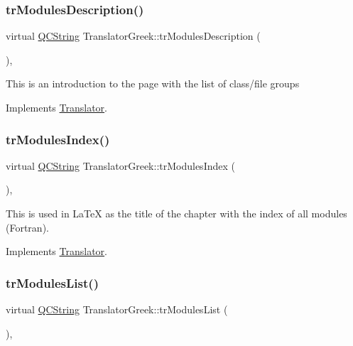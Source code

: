 \subsubsection{\texorpdfstring{trModulesDescription()}{trModulesDescription()}}
{\footnotesize\ttfamily virtual \mbox{\hyperlink{class_q_c_string}{Q\+C\+String}} Translator\+Greek\+::tr\+Modules\+Description (\begin{DoxyParamCaption}{ }\end{DoxyParamCaption})\hspace{0.3cm}{\ttfamily [inline]}, {\ttfamily [virtual]}}

This is an introduction to the page with the list of class/file groups 

Implements \mbox{\hyperlink{class_translator}{Translator}}.

\mbox{\label{class_translator_greek_a1a764773f34e724b6efe31a37a4f79de}} 
\subsubsection{\texorpdfstring{trModulesIndex()}{trModulesIndex()}}
{\footnotesize\ttfamily virtual \mbox{\hyperlink{class_q_c_string}{Q\+C\+String}} Translator\+Greek\+::tr\+Modules\+Index (\begin{DoxyParamCaption}{ }\end{DoxyParamCaption})\hspace{0.3cm}{\ttfamily [inline]}, {\ttfamily [virtual]}}

This is used in La\+TeX as the title of the chapter with the index of all modules (Fortran). 

Implements \mbox{\hyperlink{class_translator}{Translator}}.

\mbox{\label{class_translator_greek_a617664ec46372e2557437c484b0c9585}} 
\subsubsection{\texorpdfstring{trModulesList()}{trModulesList()}}
{\footnotesize\ttfamily virtual \mbox{\hyperlink{class_q_c_string}{Q\+C\+String}} Translator\+Greek\+::tr\+Modules\+List (\begin{DoxyParamCaption}{ }\end{DoxyParamCaption})\hspace{0.3cm}{\ttfamily [inline]}, {\ttfamily [virtual]}}


